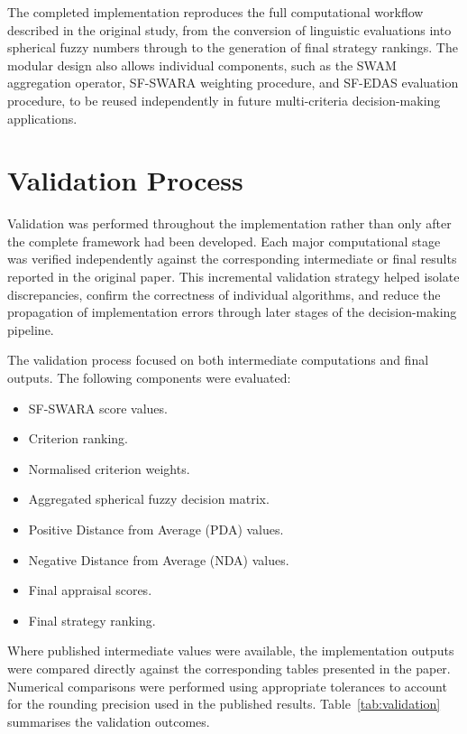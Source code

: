 \documentclass[11pt]{article}
\begin{document}
The completed implementation reproduces the full computational workflow described in the original study, from the conversion of linguistic evaluations into spherical fuzzy numbers through to the generation of final strategy rankings. The modular design also allows individual components, such as the SWAM aggregation operator, SF-SWARA weighting procedure, and SF-EDAS evaluation procedure, to be reused independently in future multi-criteria decision-making applications.

\section{Validation Process}
Validation was performed throughout the implementation rather than only after the complete framework had been developed. Each major computational stage was verified independently against the corresponding intermediate or final results reported in the original paper. This incremental validation strategy helped isolate discrepancies, confirm the correctness of individual algorithms, and reduce the propagation of implementation errors through later stages of the decision-making pipeline.

The validation process focused on both intermediate computations and final outputs. The following components were evaluated:

\begin{itemize}
    \item SF-SWARA score values.
    \item Criterion ranking.
    \item Normalised criterion weights.
    \item Aggregated spherical fuzzy decision matrix.
    \item Positive Distance from Average (PDA) values.
    \item Negative Distance from Average (NDA) values.
    \item Final appraisal scores.
    \item Final strategy ranking.
\end{itemize}

Where published intermediate values were available, the implementation outputs were compared directly against the corresponding tables presented in the paper. Numerical comparisons were performed using appropriate tolerances to account for the rounding precision used in the published results. Table~\ref{tab:validation} summarises the validation outcomes.
\end{document}

